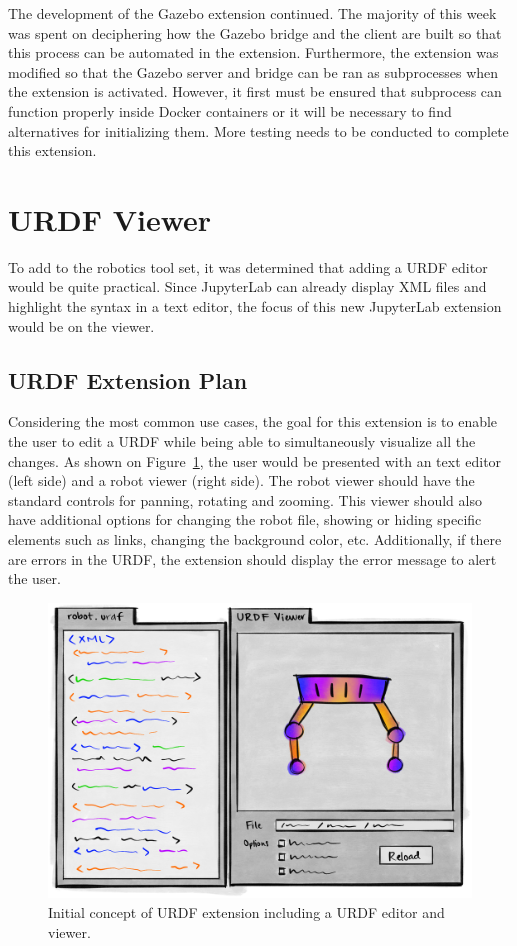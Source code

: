     The development of the Gazebo extension continued. The majority of this week was spent on deciphering how the Gazebo bridge and the client are built so that this process can be automated in the extension. Furthermore, the extension was modified so that the Gazebo server and bridge can be ran as subprocesses when the extension is activated. However, it first must be ensured that subprocess can function properly inside Docker containers or it will be necessary to find alternatives for initializing them. More testing needs to be conducted to complete this extension.



\section{URDF Viewer}

    To add to the robotics tool set, it was determined that adding a URDF editor would be quite practical. Since JupyterLab can already display XML files and highlight the syntax in a text editor, the focus of this new JupyterLab extension would be on the viewer.

    \subsection{URDF Extension Plan}

    Considering the most common use cases, the goal for this extension is to enable the user to edit a URDF while being able to simultaneously visualize all the changes. As shown on Figure~\ref{fig:urdfPlan}, the user would be presented with an text editor (left side) and a robot viewer (right side). The robot viewer should have the standard controls for panning, rotating and zooming. This viewer should also have additional options for changing the robot file, showing or hiding specific elements such as links, changing the background color, etc.
    Additionally, if there are errors in the URDF, the extension should display the error message to alert the user.


    \begin{figure}[H]
        \centering
        \includegraphics[width=\linewidth]{Images/10_urdfPlan.png}
        \caption{Initial concept of URDF extension including a URDF editor and viewer.}
        \label{fig:urdfPlan}
    \end{figure}

